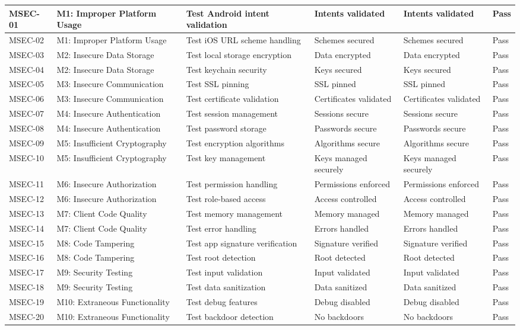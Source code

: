 {\begin{longtable}{|p{1.5cm}|p{2.5cm}|p{3.5cm}|p{2.5cm}|p{2.5cm}|p{1.5cm}|}
MSEC-01 & M1: Improper Platform Usage & Test Android intent validation & Intents validated & Intents validated & Pass \\
\hline
MSEC-02 & M1: Improper Platform Usage & Test iOS URL scheme handling & Schemes secured & Schemes secured & Pass \\
\hline
MSEC-03 & M2: Insecure Data Storage & Test local storage encryption & Data encrypted & Data encrypted & Pass \\
\hline
MSEC-04 & M2: Insecure Data Storage & Test keychain security & Keys secured & Keys secured & Pass \\
\hline
MSEC-05 & M3: Insecure Communication & Test SSL pinning & SSL pinned & SSL pinned & Pass \\
\hline
MSEC-06 & M3: Insecure Communication & Test certificate validation & Certificates validated & Certificates validated & Pass \\
\hline
MSEC-07 & M4: Insecure Authentication & Test session management & Sessions secure & Sessions secure & Pass \\
\hline
MSEC-08 & M4: Insecure Authentication & Test password storage & Passwords secure & Passwords secure & Pass \\
\hline
MSEC-09 & M5: Insufficient Cryptography & Test encryption algorithms & Algorithms secure & Algorithms secure & Pass \\
\hline
MSEC-10 & M5: Insufficient Cryptography & Test key management & Keys managed securely & Keys managed securely & Pass \\
\hline
MSEC-11 & M6: Insecure Authorization & Test permission handling & Permissions enforced & Permissions enforced & Pass \\
\hline
MSEC-12 & M6: Insecure Authorization & Test role-based access & Access controlled & Access controlled & Pass \\
\hline
MSEC-13 & M7: Client Code Quality & Test memory management & Memory managed & Memory managed & Pass \\
\hline
MSEC-14 & M7: Client Code Quality & Test error handling & Errors handled & Errors handled & Pass \\
\hline
MSEC-15 & M8: Code Tampering & Test app signature verification & Signature verified & Signature verified & Pass \\
\hline
MSEC-16 & M8: Code Tampering & Test root detection & Root detected & Root detected & Pass \\
\hline
MSEC-17 & M9: Security Testing & Test input validation & Input validated & Input validated & Pass \\
\hline
MSEC-18 & M9: Security Testing & Test data sanitization & Data sanitized & Data sanitized & Pass \\
\hline
MSEC-19 & M10: Extraneous Functionality & Test debug features & Debug disabled & Debug disabled & Pass \\
\hline
MSEC-20 & M10: Extraneous Functionality & Test backdoor detection & No backdoors & No backdoors & Pass \\
\hline
\end{longtable}
}

